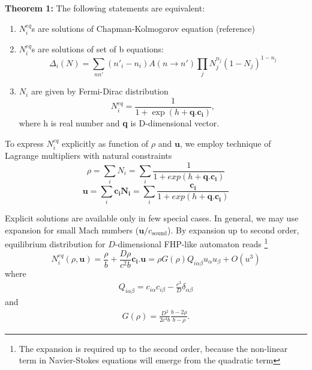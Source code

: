 \textbf{Theorem 1:}
The following statements are equivalent:
\begin{enumerate}
\item $N_i^{eq}$s are solutions of Chapman-Kolmogorov equation (reference)\\
\item $N_i^{eq}$s are solutions of set of b equations:
\begin{equation}
\Delta_i(N) = \sum_{nn'}(n'_i - n_i)A(n \rightarrow n')\prod_j N_j^{n_j}(1-N_j)^{1-n_j}
\end{equation} 

\item $N_i$ are given by Fermi-Dirac distribution
\begin{equation} \label{fd}
N_i^{eq} = \frac{1}{1 + \exp(h + \bm{q}.\bm{c_i})},
\end{equation}
where h is real number and \textbf{q} is D-dimensional vector.
\end{enumerate}

\bigskip

To express $N_i^{eq}$ explicitly as function of $\rho$ and $\bm{u}$, we employ technique of Lagrange multipliers with natural constraints
\begin{equation}
\rho = \sum_i N_i = \sum_i \frac{1}{1+ exp(h + \bm{q}.\bm{c_i})}
\end{equation}
\begin{equation}
\bm{u} = \sum_i \bm{c_i} \bm{N_i} = \sum_i \frac{\bm{c_i}}{1+ exp(h + \bm{q}.\bm{c_i})}
\end{equation}

Explicit solutions are available only in few special cases.
In general, we may use expansion for small Mach numbers ($\bm{u}/c_{\mathrm{sound}}$). By expansion up to second order, equilibrium distribution for $D$-dimensional FHP-like automaton reads \footnote{The expansion is required up to the second order, because the non-linear term in Navier-Stokes equations will emerge from the quadratic term}
\begin{equation} \label{eou}
N_i^{eq}(\rho,\bm{u}) = \frac{\rho}{b} + \frac{D\rho}{c^2 b}\bm{c_i}.\bm{u} = \rho G(\rho) Q_{i\alpha\beta}u_{\alpha}u_{\beta} + O(u^3)
\end{equation}
where 
\begin{align}
Q_{i\alpha\beta} = c_{i\alpha} c_{i\beta} - \frac{c^2}{D} \delta_{\alpha\beta}
\end{align}
and
\begin{align}
G(\rho) = \frac{D^2}{2c^4b}\frac{b-2\rho}{b-\rho}.
\end{align}

